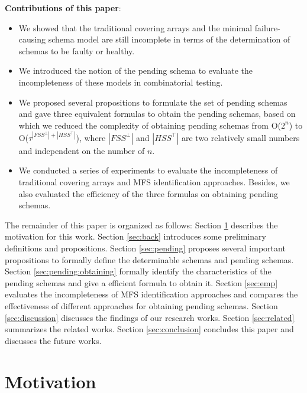 \textbf{Contributions of this paper}:
\begin{itemize}

  \item We showed that the traditional covering arrays and the minimal failure-causing schema model are still incomplete in terms of the determination of schemas to be faulty or healthy.
  \item We introduced the notion of the pending schema to evaluate the incompleteness of these models in combinatorial testing.
  \item We proposed several propositions to formulate the set of pending schemas and gave three equivalent formulas to obtain the pending schemas, based on which we reduced the complexity of obtaining pending schemas from O($2^{n}$) to O($ \tau^{|FSS^{\bot}|+|HSS^{\top}|}$), where $|FSS^{\bot}|$ and $|HSS^{\top}|$ are two relatively small numbers and independent on the number of $n$.
  \item We conducted a series of experiments to evaluate the incompleteness of traditional covering arrays and MFS identification approaches. Besides, we also evaluated the efficiency of the three formulas on obtaining pending schemas.
\end{itemize}

The remainder of this paper is organized as follows: Section \ref{sec:motiv} describes the motivation for this work. Section \ref{sec:back} introduces some preliminary definitions and propositions. Section \ref{sec:pending} proposes several important propositions to formally define the determinable schemas and pending schemas. Section \ref{sec:pending:obtaining} formally identify the characteristics of the pending schemas and give a efficient formula to obtain it. Section \ref{sec:emp} evaluates the incompleteness of MFS identification approaches and compares the effectiveness of different approaches for obtaining pending schemas. Section \ref{sec:discussion} discusses the findings of our research works.  Section \ref{sec:related} summarizes the related works. Section \ref{sec:conclusion} concludes this paper and discusses the future works.


\section{Motivation}\label{sec:motiv}

